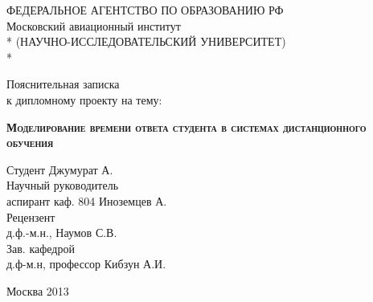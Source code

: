 \begin{titlepage}
\newpage
\begin{center}
ФЕДЕРАЛЬНОЕ АГЕНТСТВО ПО ОБРАЗОВАНИЮ РФ \\
\vspace{1cm}
Московский авиационный институт \\*
(НАУЧНО-ИССЛЕДОВАТЕЛЬСКИЙ УНИВЕРСИТЕТ) \\*
\hrulefill
\end{center}
 

\vspace{6em}

\begin{center}
\Large Пояснительная записка \\ к дипломному проекту на тему:
\end{center}

\vspace{2.5em}
 
\begin{center}
\textsc{\textbf{Моделирование времени ответа студента \linebreak в системах дистанционного обучения}}
\end{center}

\vspace{5em}
 
\begin{flushleft}
Студент \hrulefill Джумурат А. \\
\vspace{1.5em}
Научный руководитель \\
аспирант каф. 804 \hrulefill Иноземцев А.\\
\vspace{1.5em}
Рецензент \\
д.ф.-м.н., \hrulefill Наумов С.В.\\
\vspace{1.5em}
Зав. кафедрой  \\
д.ф-м.н, профессор \hrulefill Кибзун А.И.
\end{flushleft}
 
\vspace{\fill}

\begin{center}
Москва 2013
\end{center}

\end{titlepage} 
